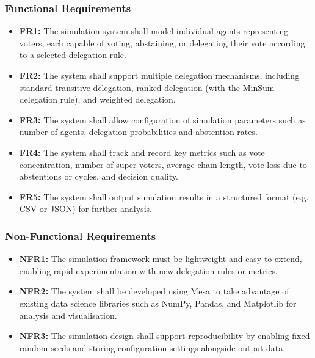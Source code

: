 \subsubsection{Functional Requirements}
\begin{itemize}
    \item \textbf{FR1:} The simulation system shall model individual agents representing voters, each capable of voting, abstaining, or delegating their vote according to a selected delegation rule.

    \item \textbf{FR2:} The system shall support multiple delegation mechanisms, including standard transitive delegation, ranked delegation (with the MinSum delegation rule), and weighted delegation.

    \item \textbf{FR3:} The system shall allow configuration of simulation parameters such as number of agents, delegation probabilities and abstention rates.

    \item \textbf{FR4:} The system shall track and record key metrics such as vote concentration, number of super-voters, average chain length, vote loss due to abstentions or cycles, and decision quality.

    \item \textbf{FR5:} The system shall output simulation results in a structured format (e.g. CSV or JSON) for further analysis.
\end{itemize}

\subsubsection{Non-Functional Requirements}
\begin{itemize}
    \item \textbf{NFR1:} The simulation framework must be lightweight and easy to extend, enabling rapid experimentation with new delegation rules or metrics.

    \item \textbf{NFR2:} The system shall be developed using Mesa to take advantage of existing data science libraries such as NumPy, Pandas, and Matplotlib for analysis and visualisation.

    \item \textbf{NFR3:} The simulation design shall support reproducibility by enabling fixed random seeds and storing configuration settings alongside output data.

\end{itemize}

